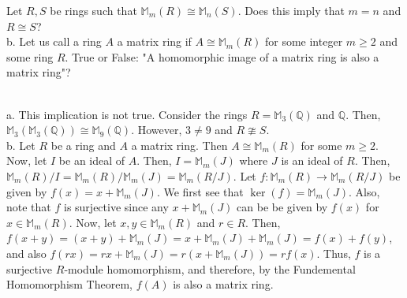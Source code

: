 Let $R, S$ be rings such that $\mathbb{M}_m(R)\cong\mathbb{M}_n(S)$. Does this imply that $m=n$ and
$R\cong S$?\\
b. Let us call a ring $A$ a matrix ring if $A\cong\mathbb{M}_m(R)$ for some integer $m\geq2$ and some
ring $R$. True or False: "A homomorphic image of a matrix ring is also a matrix ring"?\\

\begin{solution}\renewcommand{\qedsymbol}{}\ \\
    a. This implication is not true. Consider the rings $R=\mathbb{M}_3(\mathbb{Q})$ and $\mathbb{Q}$.
    Then, $\mathbb{M}_3(\mathbb{M}_3(\mathbb{Q}))\cong\mathbb{M}_9(\mathbb{Q})$. However, $3\neq9$ and
    $R\ncong S$.\\

    b. Let $R$ be a ring and $A$ a matrix ring. Then $A\cong\mathbb{M}_m(R)$ for some $m\geq2$. Now,
    let $I$ be an ideal of $A$. Then, $I=\mathbb{M}_m(J)$ where $J$ is an ideal of $R$. Then,
    $\mathbb{M}_m(R)/I=\mathbb{M}_m(R)/\mathbb{M}_m(J)=\mathbb{M}_m(R/J)$. Let
    $f:\mathbb{M}_m(R)\rightarrow\mathbb{M}_m(R/J)$ be given by $f(x)=x+\mathbb{M}_m(J)$. We first see
    that $\ker(f)=\mathbb{M}_m(J)$. Also, note that $f$ is surjective since any $x+\mathbb{M}_m(J)$ can
    be be given by $f(x)$ for $x\in\mathbb{M}_m(R)$. Now, let $x,y\in\mathbb{M}_m(R)$ and $r\in R$.
    Then, $f(x+y)=(x+y)+\mathbb{M}_m(J)=x+\mathbb{M}_m(J)+\mathbb{M}_m(J)=f(x)+f(y)$, and also
    $f(rx)=rx+\mathbb{M}_m(J)=r(x+\mathbb{M}_m(J))=rf(x)$. Thus, $f$ is a surjective $R$-module
    homomorphism, and therefore, by the Fundemental Homomorphism Theorem, $f(A)$ is also a matrix ring.

\end{solution}
